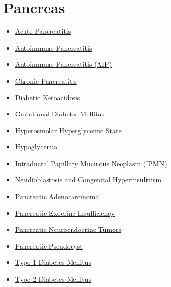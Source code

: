 \section*{Pancreas}
\label{sec:organ_pancreas}
\begin{itemize}[noitemsep]
  \item \hyperlink{sec:Acute Pancreatitis}{Acute Pancreatitis}
  \item \hyperlink{sec:Autoimmune Pancreatitis}{Autoimmune Pancreatitis}
  \item \hyperlink{sec:Autoimmune Pancreatitis (AIP)}{Autoimmune Pancreatitis (AIP)}
  \item \hyperlink{sec:Chronic Pancreatitis}{Chronic Pancreatitis}
  \item \hyperlink{sec:Diabetic Ketoacidosis}{Diabetic Ketoacidosis}
  \item \hyperlink{sec:Gestational Diabetes Mellitus}{Gestational Diabetes Mellitus}
  \item \hyperlink{sec:Hyperosmolar Hyperglycemic State}{Hyperosmolar Hyperglycemic State}
  \item \hyperlink{sec:Hypoglycemia}{Hypoglycemia}
  \item \hyperlink{sec:Intraductal Papillary Mucinous Neoplasm (IPMN)}{Intraductal Papillary Mucinous Neoplasm (IPMN)}
  \item \hyperlink{sec:Nesidioblastosis and Congenital Hyperinsulinism}{Nesidioblastosis and Congenital Hyperinsulinism}
  \item \hyperlink{sec:Pancreatic Adenocarcinoma}{Pancreatic Adenocarcinoma}
  \item \hyperlink{sec:Pancreatic Exocrine Insufficiency}{Pancreatic Exocrine Insufficiency}
  \item \hyperlink{sec:Pancreatic Neuroendocrine Tumors}{Pancreatic Neuroendocrine Tumors}
  \item \hyperlink{sec:Pancreatic Pseudocyst}{Pancreatic Pseudocyst}
  \item \hyperlink{sec:Type 1 Diabetes Mellitus}{Type 1 Diabetes Mellitus}
  \item \hyperlink{sec:Type 2 Diabetes Mellitus}{Type 2 Diabetes Mellitus}
\end{itemize}

